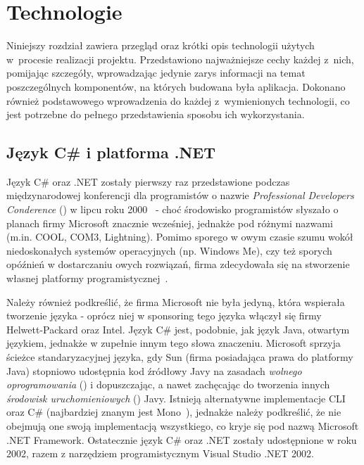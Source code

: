 \chapter{Technologie}\label{chap:technologie}

Niniejszy rozdział zawiera przegląd oraz krótki opis technologii użytych w~procesie realizacji projektu. Przedstawiono najważniejsze cechy każdej z~nich, pomijając szczegóły, wprowadzając jedynie zarys informacji na temat poszczególnych komponentów, na których budowana była aplikacja. Dokonano również podstawowego wprowadzenia do każdej z~wymienionych technologii, co jest potrzebne do pełnego przedstawienia sposobu ich wykorzystania.

\section{Język C\# i platforma .NET}\label{sec:cs}
Język C\# oraz .NET zostały pierwszy raz przedstawione podczas międzynarodowej konferencji dla programistów o nazwie \emph{Professional Developers Conderence} () w lipcu roku 2000~\cite{ms:initDotNet} - choć środowisko programistów słyszało o planach firmy Microsoft znacznie wcześniej, jednakże pod różnymi nazwami (m.in. COOL, COM3, Lightning). Pomimo sporego w owym czasie szumu wokół niedoskonałych systemów operacyjnych (np. Windows Me), czy też sporych opóźnień w dostarczaniu owych rozwiązań, firma zdecydowała się na stworzenie własnej platformy programistycznej~\cite{cSharp:inDepthF}.

Należy również podkreślić, że firma Microsoft nie była jedyną, która wspierała tworzenie języka - oprócz niej w sponsoring tego języka włączył się firmy Helwett-Packard oraz Intel. Język C\# jest, podobnie, jak język Java, otwartym językiem, jednakże w zupełnie innym tego słowa znaczeniu. Microsoft sprzyja ścieżce standaryzacyjnej języka, gdy Sun (firma posiadająca prawa do platformy Java) stopniowo udostępnia kod źródłowy Javy na zasadach \emph{wolnego oprogramowania} () i dopuszczając, a nawet zachęcając do tworzenia innych \emph{środowisk uruchomieniowych} () Javy. Istnieją alternatywne implementacje CLI oraz C\# (najbardziej znanym jest Mono~\cite{cs:mono}), jednakże należy podkreślić, że nie obejmują one swoją implementacją wszystkiego, co kryje się pod nazwą Microsoft .NET Framework. Ostatecznie język C\# oraz .NET zostały udostępnione w roku 2002, razem z narzędziem programistycznym Visual Studio .NET 2002.

